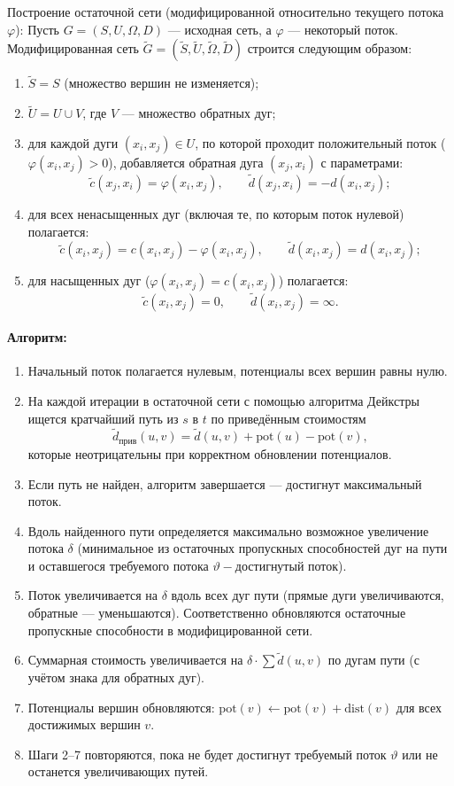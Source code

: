 Построение остаточной сети (модифицированной относительно текущего потока $\varphi$):
Пусть $G = (S, U, \Omega, D)$ — исходная сеть, а $\varphi$ — некоторый поток. Модифицированная сеть $\tilde{G} = (\tilde{S}, \tilde{U}, \tilde{\Omega}, \tilde{D})$ строится следующим образом:
\begin{enumerate}
	\item $\tilde{S} = S$ (множество вершин не изменяется);
	\item $\tilde{U} = U \cup V$, где $V$ — множество обратных дуг;
	\item для каждой дуги $(x_i, x_j) \in U$, по которой проходит положительный поток ($\varphi(x_i, x_j) > 0$), добавляется обратная дуга $(x_j, x_i)$ с параметрами:
	\[
	\tilde{c}(x_j, x_i) = \varphi(x_i, x_j), \qquad \tilde{d}(x_j, x_i) = -d(x_i, x_j);
	\]
	\item для всех ненасыщенных дуг (включая те, по которым поток нулевой) полагается:
	\[
	\tilde{c}(x_i, x_j) = c(x_i, x_j) - \varphi(x_i, x_j), \qquad \tilde{d}(x_i, x_j) = d(x_i, x_j);
	\]
	\item для насыщенных дуг ($\varphi(x_i, x_j) = c(x_i, x_j)$) полагается:
	\[
	\tilde{c}(x_i, x_j) = 0, \qquad \tilde{d}(x_i, x_j) = \infty.
	\]
\end{enumerate}

\paragraph{Алгоритм:}
\begin{enumerate}
	\item Начальный поток полагается нулевым, потенциалы всех вершин равны нулю.
	\item На каждой итерации в остаточной сети с помощью алгоритма Дейкстры ищется кратчайший путь из $s$ в $t$ по приведённым стоимостям
	\[
	\tilde{d}_{\text{прив}}(u, v) = \tilde{d}(u, v) + \text{pot}(u) - \text{pot}(v),
	\]
	которые неотрицательны при корректном обновлении потенциалов.
	\item Если путь не найден, алгоритм завершается — достигнут максимальный поток.
	\item Вдоль найденного пути определяется максимально возможное увеличение потока $\delta$ (минимальное из остаточных пропускных способностей дуг на пути и оставшегося требуемого потока $\vartheta - \text{достигнутый поток}$).
	\item Поток увеличивается на $\delta$ вдоль всех дуг пути (прямые дуги увеличиваются, обратные — уменьшаются). Соответственно обновляются остаточные пропускные способности в модифицированной сети.
	\item Суммарная стоимость увеличивается на $\delta \cdot \sum \tilde{d}(u,v)$ по дугам пути (с учётом знака для обратных дуг).
	\item Потенциалы вершин обновляются: $\text{pot}(v) \leftarrow \text{pot}(v) + \text{dist}(v)$ для всех достижимых вершин $v$.
	\item Шаги 2–7 повторяются, пока не будет достигнут требуемый поток $\vartheta$ или не останется увеличивающих путей.
\end{enumerate}

